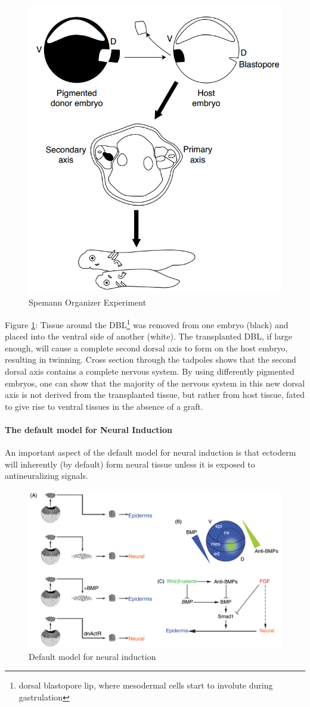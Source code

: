 \documentclass[12pt,article,oneside,a4paper]{memoir}
\begin{document}
\begin{figure}
	\centering
  	\includegraphics[width=0.5\linewidth]{imgs/spemann_organizer.png}
	\caption{Spemann Organizer Experiment}
  	\label{fig:spemannOrganizer}
\end{figure}

Figure \ref{fig:spemannOrganizer}: Tissue around the DBL\footnote{dorsal blastopore lip, where mesodermal cells start to involute during gastrulation} was removed from one embryo
(black) and placed into the ventral side of another (white). The transplanted DBL, if large enough, will cause a complete second dorsal axis to form on the host embryo, resulting in twinning. Cross section through the tadpoles shows that the second dorsal axis contains a complete nervous system. By using differently pigmented embryos, one can show that the majority of the nervous system in this new dorsal axis is not derived from the transplanted tissue, but rather from host tissue, fated to give rise to ventral tissues in the absence of a graft.

\paragraph{The default model for Neural Induction}
An important aspect of the default model for neural induction is that ectoderm will inherently (by default) form neural tissue unless it is exposed to antineuralizing signals.

\begin{figure}
	\centering
  	\includegraphics[width=\linewidth]{imgs/neural_induction.png}
	\caption{Default model for neural induction}
  	\label{fig:neuralInduction}
\end{figure}
\end{document}
